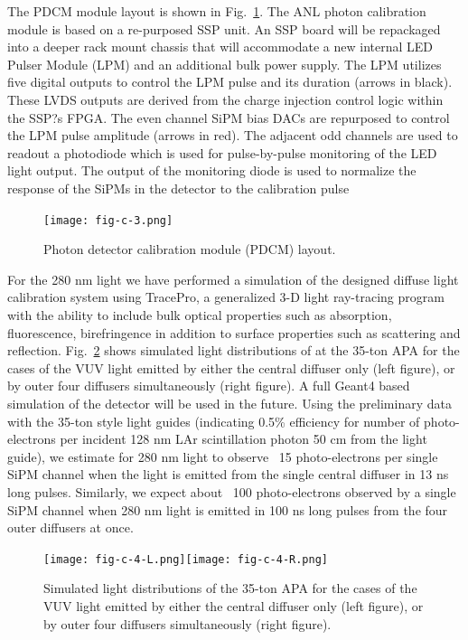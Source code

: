The PDCM module layout is shown in Fig.~\ref{fig:fig-c-3}. The ANL
photon calibration module is based on a re-purposed SSP unit.  An SSP
board will be repackaged into a deeper rack mount chassis that will
accommodate a new internal LED Pulser Module (LPM) and an additional
bulk power supply. The LPM utilizes five digital outputs to control
the LPM pulse and its duration (arrows in black).  These LVDS outputs
are derived from the charge injection control logic within the SSP?s
FPGA.  The even channel SiPM bias DACs are repurposed to control the
LPM pulse amplitude (arrows in red).  The adjacent odd channels are
used to readout a photodiode which is used for pulse-by-pulse
monitoring of the LED light output.  The output of the monitoring
diode is used to normalize the response of the SiPMs in the detector
to the calibration pulse

%
 \begin{figure}[h]
  \centering
\texttt{[image: fig-c-3.png]}
\caption{Photon detector calibration module (PDCM) layout.}
\label{fig:fig-c-3}
\end{figure}
%

For the 280 nm light we have performed a simulation of the designed
diffuse light calibration system using TracePro, a generalized 3-D
light ray-tracing program with the ability to include bulk optical
properties such as absorption, fluorescence, birefringence in addition
to surface properties such as scattering and
reflection. Fig.~\ref{fig:fig-c-4} shows simulated light distributions
of at the 35-ton APA for the cases of the VUV light emitted by either
the central diffuser only (left figure), or by outer four diffusers
simultaneously (right figure). A full Geant4 based simulation of the
detector will be used in the future. Using the preliminary data with
the 35-ton style light guides (indicating 0.5\% efficiency for number
of photo-electrons per incident 128 nm LAr scintillation photon 50 cm
from the light guide), we estimate for 280 nm light to observe ~15
photo-electrons per single SiPM channel when the light is emitted from
the single central diffuser in 13 ns long pulses. Similarly, we expect
about ~100 photo-electrons observed by a single SiPM channel when 280
nm light is emitted in 100 ns long pulses from the four outer
diffusers at once.

%
 \begin{figure}[h]
  \centering
  \texttt{[image: fig-c-4-L.png]}\texttt{[image: fig-c-4-R.png]}
\caption[Simulated light distributions of the 35-ton APA, two cases]
{Simulated light distributions of the 35-ton APA for the
  cases of the VUV light emitted by either the central diffuser only
  (left figure), or by outer four diffusers simultaneously (right
  figure).}
\label{fig:fig-c-4}
\end{figure}
%

